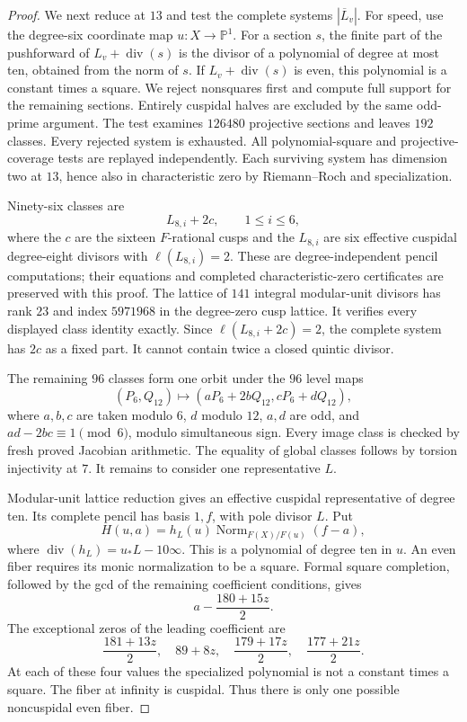 \begin{proof}
We next reduce at $13$ and test the complete systems $|\overline L_v|$.
For speed, use the degree-six coordinate map $u:X\to\mathbb P^1$.
For a section $s$, the finite part of the pushforward of
$L_v+\operatorname{div}(s)$ is the divisor of a polynomial of
degree at most ten, obtained from the norm of $s$.
If $L_v+\operatorname{div}(s)$ is even, this polynomial is a
constant times a square. We reject nonsquares first and compute
full support for the remaining sections. Entirely cuspidal halves
are excluded by the same odd-prime argument.
The test examines $126480$ projective sections and leaves $192$
classes. Every rejected system is exhausted. All polynomial-square
and projective-coverage tests are replayed independently.
Each surviving system has dimension two at $13$, hence also
in characteristic zero by Riemann--Roch and specialization.

Ninety-six classes are
\[
 L_{8,i}+2c,\qquad 1\le i\le6,
\]
where the $c$ are the sixteen $F$-rational cusps and the $L_{8,i}$
are six effective cuspidal degree-eight divisors with
$\ell(L_{8,i})=2$. These are degree-independent pencil computations;
their equations and completed characteristic-zero certificates
are preserved with this proof.
The lattice of $141$ integral modular-unit divisors has rank $23$
and index $5971968$ in the degree-zero cusp lattice.
It verifies every displayed class identity exactly.
Since $\ell(L_{8,i}+2c)=2$, the complete system has $2c$ as a
fixed part. It cannot contain twice a closed quintic divisor.

The remaining $96$ classes form one orbit under the $96$ level maps
\[
 (P_6,Q_{12})\longmapsto(aP_6+2bQ_{12},cP_6+dQ_{12}),
\]
where $a,b,c$ are taken modulo $6$, $d$ modulo $12$,
$a,d$ are odd, and $ad-2bc\equiv1\pmod6$, modulo simultaneous sign.
Every image class is checked by fresh proved Jacobian arithmetic.
The equality of global classes follows by torsion injectivity at $7$.
It remains to consider one representative $L$.

Modular-unit lattice reduction gives an effective cuspidal
representative of degree ten. Its complete pencil has basis
$1,f$, with pole divisor $L$. Put
\[
 H(u,a)=h_L(u)\operatorname{Norm}_{F(X)/F(u)}(f-a),
\]
where $\operatorname{div}(h_L)=u_*L-10\infty$.
This is a polynomial of degree ten in $u$. An even fiber requires
its monic normalization to be a square.
Formal square completion, followed by the gcd of the remaining
coefficient conditions, gives
\[
 a-\frac{180+15z}{2}.
\]
The exceptional zeros of the leading coefficient are
\[
 \frac{181+13z}{2},\quad 89+8z,\quad
 \frac{179+17z}{2},\quad\frac{177+21z}{2}.
\]
At each of these four values the specialized polynomial is not
a constant times a square. The fiber at infinity is cuspidal.
Thus there is only one possible noncuspidal even fiber.


\end{proof}
